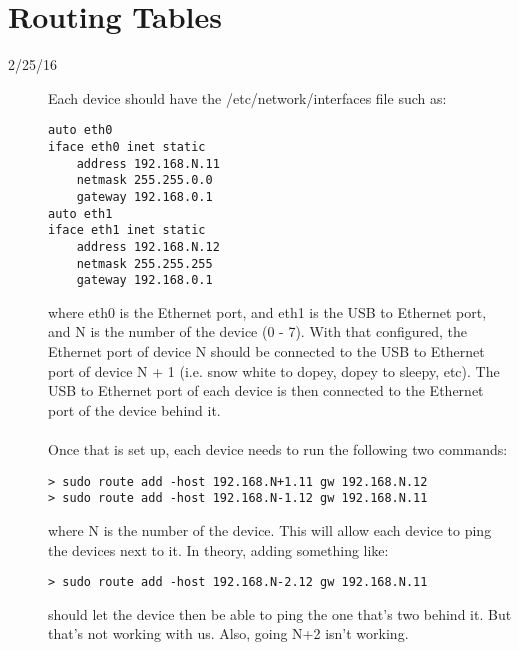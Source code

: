 \section{Routing Tables}
\begin{description}
\item [2/25/16] Each device should have the /etc/network/interfaces file such as: \\
\begin{lstlisting}
auto eth0
iface eth0 inet static
	address 192.168.N.11
	netmask 255.255.0.0
	gateway 192.168.0.1
auto eth1
iface eth1 inet static 
	address 192.168.N.12
	netmask 255.255.255
	gateway 192.168.0.1
\end{lstlisting}

where eth0 is the Ethernet port, and eth1 is the USB to Ethernet port, and N is the number of the device (0 - 7). With that configured, the Ethernet port of device N should be connected to the USB to Ethernet port of device N + 1 (i.e. snow white to dopey, dopey to sleepy, etc). The USB to Ethernet port of each device is then connected to the Ethernet port of the device behind it. \\ \\
Once that is set up, each device needs to run the following two commands:

\begin{lstlisting}
> sudo route add -host 192.168.N+1.11 gw 192.168.N.12
> sudo route add -host 192.168.N-1.12 gw 192.168.N.11
\end{lstlisting}

where N is the number of the device. This will allow each device to ping the devices next to it. In theory, adding something like:
\begin{lstlisting}
> sudo route add -host 192.168.N-2.12 gw 192.168.N.11
\end{lstlisting}
should let the device then be able to ping the one that's two behind it. But that's not working with us. Also, going N+2 isn't working.


\end{description}
